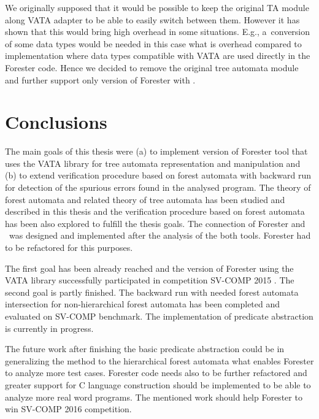 \documentclass[fleqn,11pt]{ExcelAtFIT} %
\begin{document}
We originally supposed that it would be possible to keep the original TA module along VATA adapter
to be able to easily switch between them.
However it has shown that this would bring high overhead in some situations.
E.g., a~conversion of some data types would be needed in this case
what is overhead compared to implementation where data types compatible with VATA are used directly in the Forester code.
Hence we decided to remove the original tree automata module and further support only version of Forester with \vata.

\section{Conclusions}
\label{sec:concl}

The main goals of this thesis were (a) to implement version of Forester tool that uses the VATA library for tree automata representation and manipulation
and (b) to extend verification procedure based on forest automata with backward run for detection of the spurious errors found in the analysed program.
The theory of forest automata and related theory of tree automata has been studied and described in this thesis and the verification procedure
based on forest automata has been also explored to fulfill the thesis goals.
The connection of Forester and \vata\ was designed and implemented after the analysis of the both tools.
Forester had to be refactored for this purposes.

The first goal has been already reached and the version of Forester using the VATA library successfully participated in competition SV-COMP 2015 \cite{www:svcomp}.
The second goal is partly finished.
The backward run with needed forest automata intersection for non-hierarchical forest automata has been completed and evaluated on SV-COMP benchmark.
The implementation of predicate abstraction is currently in progress.

The future work after finishing the basic predicate abstraction could be in generalizing the method to the hierarchical forest automata
what enables Forester to analyze more test cases.
Forester code needs also to be further refactored and greater support for C language construction should be implemented to be
able to analyze more real word programs.
The mentioned work should help Forester to win SV-COMP 2016 competition.
\end{document}
